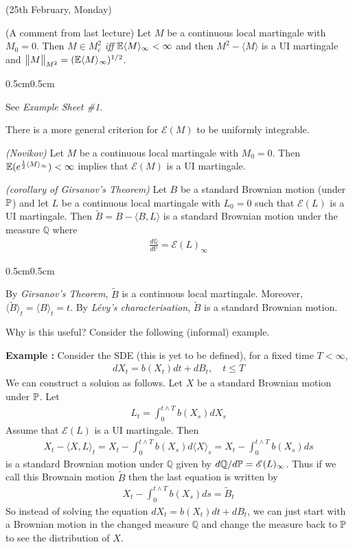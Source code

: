 \documentclass[10pt,a4paper]{article}
\newenvironment{proof}
{\begin{changemargin}{0.5cm}{0.5cm} 
	}%
	{\end{changemargin}
}
\newenvironment{p}
{\begin{proof} 
	}%
	{\end{proof}
}
\begin{document}
(25th February, Monday)
\s

(A comment from last lecture) \prop Let $M$ be a continuous local martingale with $M_0 =0$. Then $M \in M_c^2$ \emph{iff} $\mathbb{E} \langle M \rangle_{\infty} < \infty$ and then $M^2 - \langle M \rangle$ is a UI martingale and $\bigl\lVert M\bigr\rVert_{M^2} = (\mathbb{E} \langle M \rangle_{\infty})^{1/2}$.
\begin{p}
\pf See \emph{Example Sheet \#1}.
\end{p}
\s

There is a more general criterion for $\mathscr{E}(M)$ to be uniformly integrable.
\s

\thm \emph{(Novikov)} Let $M$ be a continuous local martingale with $M_0 = 0$. Then $\mathbb{E} (e^{\frac{1}{2} \langle M \rangle_{\infty}})< \infty$ implies that $\mathscr{E}(M)$ is a UI martingale.
\s

\corr \emph{(corollary of Girsanov's Theorem)} Let $B$ be a standard Brownian motion (under $\mathbb{P}$) and let $L$ be a continuous local martingale with $L_0 = 0$ such that $\mathscr{E}(L)$ is a UI martingale. Then $\tilde{B} = B- \langle B, L \rangle$ is a standard Brownian motion under the measure $\mathbb{Q}$ where
\begin{align*}
\frac{d\mathbb{Q}}{d\mathbb{P}} = \mathscr{E}(L)_{\infty}
\end{align*}
\begin{p}
\pf By \emph{Girsanov's Theorem}, $\tilde{B}$ is a continuous local martingale. Moreover, $\langle \tilde{B}\rangle_t = \langle B\rangle_t =t$. By \emph{L\'{e}vy's characterisation}, $\tilde{B}$ is a standard Brownian motion.

\eop
\end{p}
\s

Why is this useful? Consider the following (informal) example.
\s

\textbf{Example :} Consider the SDE (this is yet to be defined), for a fixed time $T< \infty$,
\begin{align*}
dX_t =b(X_t) dt + dB_t, \quad t\leq T
\end{align*}
We can construct a soluion as follows. Let $X$ be a standard Brownian motion under $\mathbb{P}$. Let
\begin{align*}
L_t = \int_0^{t\wedge T} b(X_s) dX_s
\end{align*}
Assume that $\mathscr{E}(L)$ is a UI martingale. Then
\begin{align*}
X_t - \langle X, L\rangle_t = X_t - \int_0^{t\wedge T} b(X_s) d\langle X \rangle_s = X_t - \int_0^{t\wedge T} b(X_s) ds
\end{align*}
is a standard Brownian motion under $\mathbb{Q}$ given by $d\mathbb{Q} / d\mathbb{P} = \mathscr{E}(L)_{\infty}$. Thus if we call this Brownain motion $\tilde{B}$ then the last equation is written by
\begin{align*}
X_t - \int_0^{t\wedge T}b(X_s) ds = \tilde{B}_t
\end{align*}
So instead of solving the equation $dX_t = b(X_t) dt + dB_t$, we can just start with a Brownian motion in the changed measure $\mathbb{Q}$ and change the measure back to $\mathbb{P}$ to see the distribution of $X$.
\end{document}
